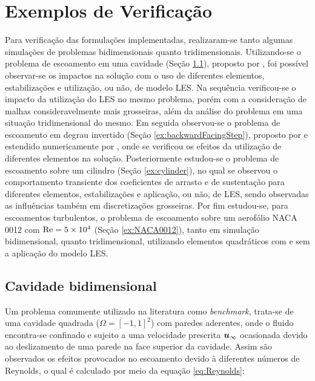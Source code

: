 \section{Exemplos de Verificação} \label{ExemplosMT}

Para verificação das formulações implementadas, realizaram-se tanto algumas simulações de problemas bidimensionais quanto tridimensionais. Utilizando-se o problema de escoamento em uma cavidade (Seção \ref{ex:cavity}), proposto por , foi possível observar-se os impactos na solução com o uso de diferentes elementos, estabilizações e utilização, ou não, de modelo LES. Na sequência verificou-se o impacto da utilização do LES no mesmo problema, porém com a consideração de malhas consideravelmente mais grosseiras, além da análise do problema em uma situação tridimensional do mesmo. Em seguida observou-se o problema de escoamento em degrau invertido (Seção \ref{ex:backwardFacingStep}), proposto por  e estendido numericamente por , onde se verificou os efeitos da utilização de diferentes elementos na solução. Posteriormente estudou-se o problema de escoamento sobre um cilindro (Seção \ref{ex:cylinder}), no qual se observou o comportamento transiente dos coeficientes de arrasto e de sustentação para diferentes elementos, estabilizações e aplicação, ou não, de LES, sendo observadas as influências também em discretizações grosseiras. Por fim estudou-se, para escoamentos turbulentos, o problema de escoamento sobre um aerofólio NACA 0012 com $\mathrm{Re}=5\times10^4$ (Seção \ref{ex:NACA0012}), tanto em simulação bidimensional, quanto tridimensional, utilizando elementos quadráticos com e sem a aplicação do modelo LES.

\subsection{Cavidade bidimensional} \label{ex:cavity}

Um problema comumente utilizado na literatura como \textit{benchmark}, trata-se de uma cavidade quadrada ($\Omega=[-1,1]^2$) com paredes aderentes, onde o fluido encontra-se confinado e sujeito a uma velocidade prescrita $\boldsymbol{u}_\infty$ ocasionada devido ao deslizamento de uma parede na face superior da cavidade. Assim são observados os efeitos provocados no escoamento devido à diferentes números de Reynolds, o qual é calculado por meio da equação \eqref{eq:Reynolds}:


